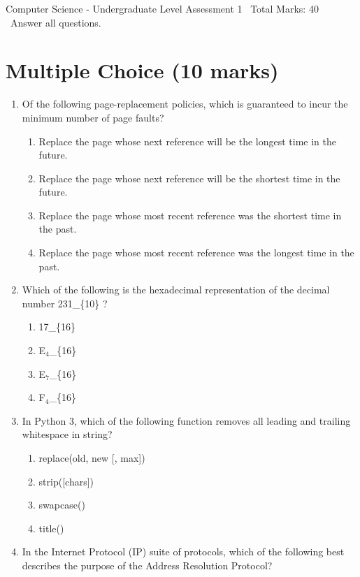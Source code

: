 \documentclass[12pt]{article}
\begin{document}
\begin{center}
Computer Science - Undergraduate Level Assessment 1 \
Total Marks: 40 \
Answer all questions.
\end{center}

\section*{Multiple Choice (10 marks)}
\begin{enumerate}[label=\arabic*.]
\item Of the following page-replacement policies, which is guaranteed to incur the minimum number of page faults?
\begin{enumerate}[label=(\alph*)]
    \item Replace the page whose next reference will be the longest time in the future.
    \item Replace the page whose next reference will be the shortest time in the future.
    \item Replace the page whose most recent reference was the shortest time in the past.
    \item Replace the page whose most recent reference was the longest time in the past.
\end{enumerate}
\item Which of the following is the hexadecimal representation of the decimal number 231\_\{10\} ?
\begin{enumerate}[label=(\alph*)]
    \item 17\_\{16\}
    \item E$_{4}$\_\{16\}
    \item E$_{7}$\_\{16\}
    \item F$_{4}$\_\{16\}
\end{enumerate}
\item In Python 3, which of the following function removes all leading and trailing whitespace in string?
\begin{enumerate}[label=(\alph*)]
    \item replace(old, new [, max])
    \item strip([chars])
    \item swapcase()
    \item title()
\end{enumerate}
\item In the Internet Protocol (IP) suite of protocols, which of the following best describes the purpose of the Address Resolution Protocol?
\begin{enumerate}[label=(\alph*)]

\end{enumerate}
\end{enumerate}
\end{document}
